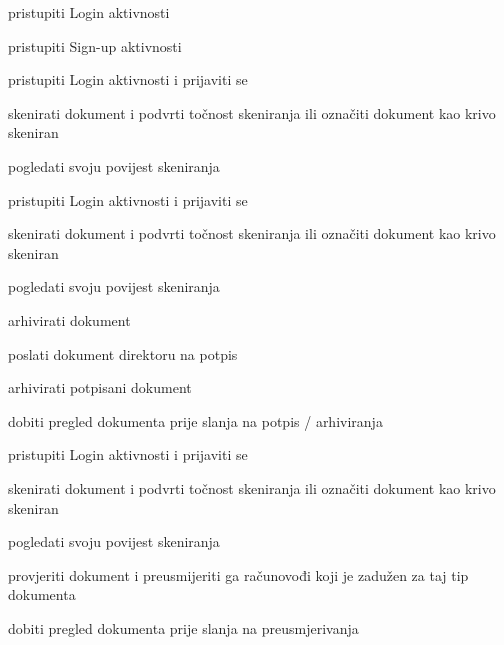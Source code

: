 	
	\begin{packed_enum}
		\item  {}
		
		\begin{packed_enum}
			
			\item pristupiti Login aktivnosti
			\item pristupiti Sign-up aktivnosti
			
		\end{packed_enum}
		
		\item  {}
		
		\begin{packed_enum}
			
			\item pristupiti Login aktivnosti i prijaviti se
			\item skenirati dokument i podvrti točnost skeniranja ili označiti dokument kao krivo skeniran
			\item pogledati svoju povijest skeniranja
			
		\end{packed_enum}
		
		\item  {}
		
		\begin{packed_enum}
			
			\item pristupiti Login aktivnosti i prijaviti se
			\item skenirati dokument i podvrti točnost skeniranja ili označiti dokument kao krivo skeniran
			\item pogledati svoju povijest skeniranja
			\item arhivirati dokument
			\item poslati dokument direktoru na potpis
			\item arhivirati potpisani dokument
			\item dobiti pregled dokumenta prije slanja na potpis / arhiviranja 
			
		\end{packed_enum}
		
		\item  {}
		
		\begin{packed_enum}
			
			\item pristupiti Login aktivnosti i prijaviti se
			\item skenirati dokument i podvrti točnost skeniranja ili označiti dokument kao krivo skeniran
			\item pogledati svoju povijest skeniranja
			\item provjeriti dokument i preusmijeriti ga računovođi koji je zadužen za taj tip dokumenta
			\item dobiti pregled dokumenta prije slanja na preusmjerivanja
			

\end{packed_enum}
\end{packed_enum}
